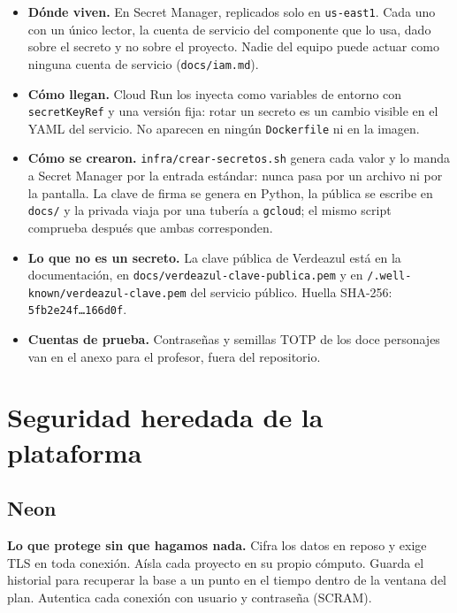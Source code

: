 \documentclass[11pt,letterpaper]{article}
\newcommand{\cod}[1]{\texttt{\small #1}}
\newcommand{\arch}[1]{\texttt{\small #1}}
\begin{document}
\begin{itemize}
  \item \textbf{Dónde viven.} En Secret Manager, replicados solo en \cod{us-east1}. Cada uno con un único lector, la cuenta de servicio del componente que lo usa, dado sobre el secreto y no sobre el proyecto. Nadie del equipo puede actuar como ninguna cuenta de servicio (\cod{docs/iam.md}).
  \item \textbf{Cómo llegan.} Cloud Run los inyecta como variables de entorno con \cod{secretKeyRef} y una versión fija: rotar un secreto es un cambio visible en el YAML del servicio. No aparecen en ningún \cod{Dockerfile} ni en la imagen.
  \item \textbf{Cómo se crearon.} \arch{infra/crear-secretos.sh} genera cada valor y lo manda a Secret Manager por la entrada estándar: nunca pasa por un archivo ni por la pantalla. La clave de firma se genera en Python, la pública se escribe en \cod{docs/} y la privada viaja por una tubería a \cod{gcloud}; el mismo script comprueba después que ambas corresponden.
  \item \textbf{Lo que no es un secreto.} La clave pública de Verdeazul está en la documentación, en \cod{docs/verdeazul-clave-publica.pem} y en \cod{/.well-known/verdeazul-clave.pem} del servicio público. Huella SHA-256: \cod{5fb2e24f\ldots166d0f}.
  \item \textbf{Cuentas de prueba.} Contraseñas y semillas TOTP de los doce personajes van en el anexo para el profesor, fuera del repositorio.
\end{itemize}

\section{Seguridad heredada de la plataforma}

\subsection{Neon}

\textbf{Lo que protege sin que hagamos nada.} Cifra los datos en reposo y exige TLS en toda conexión. Aísla cada proyecto en su propio cómputo. Guarda el historial para recuperar la base a un punto en el tiempo dentro de la ventana del plan. Autentica cada conexión con usuario y contraseña (SCRAM).
\end{document}
